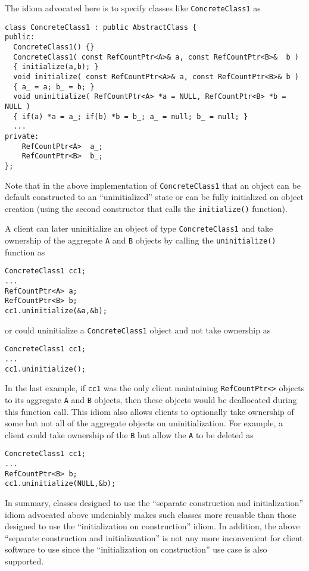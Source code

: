 The idiom advocated here is to specify classes like
{}\texttt{ConcreteClass1} as
%
{\scriptsize\begin{verbatim}
class ConcreteClass1 : public AbstractClass {
public:
  ConcreteClass1() {}
  ConcreteClass1( const RefCountPtr<A>& a, const RefCountPtr<B>&  b )
  { initialize(a,b); }
  void initialize( const RefCountPtr<A>& a, const RefCountPtr<B>& b )
  { a_ = a; b_ = b; }
  void uninitialize( RefCountPtr<A> *a = NULL, RefCountPtr<B> *b = NULL )
  { if(a) *a = a_; if(b) *b = b_; a_ = null; b_ = null; }
  ...
private:
    RefCountPtr<A>  a_;
    RefCountPtr<B>  b_;
};
\end{verbatim}}

Note that in the above implementation of {}\texttt{ConcreteClass1}
that an object can be default constructed to an ``uninitialized''
state or can be fully initialized on object creation (using the second
constructor that calls the {}\texttt{initialize()} function).

A client can later uninitialize an object of type
{}\texttt{Concrete\-Class1} and take ownership of the aggregate
{}\texttt{A} and {}\texttt{B} objects by calling the
{}\texttt{uninitialize()} function as

{\scriptsize\begin{verbatim}
ConcreteClass1 cc1;
...
RefCountPtr<A> a;
RefCountPtr<B> b;
cc1.uninitialize(&a,&b);
\end{verbatim}}

{}\noindent{}or could uninitialize a {}\texttt{Concrete\-Class1}
object and not take ownership as

{\scriptsize\begin{verbatim}
ConcreteClass1 cc1;
...
cc1.uninitialize();
\end{verbatim}}

{}\noindent{}In the last example, if {}\texttt{cc1} was the only
client maintaining {}\texttt{RefCountPtr<>} objects to its aggregate
{}\texttt{A} and {}\texttt{B} objects, then these objects would be
deallocated during this function call.  This idiom also allows clients
to optionally take ownership of some but not all of the aggregate
objects on uninitialization.  For example, a client could take
ownership of the {}\texttt{B} but allow the {}\texttt{A} to be deleted
as

{\scriptsize\begin{verbatim}
ConcreteClass1 cc1;
...
RefCountPtr<B> b;
cc1.uninitialize(NULL,&b);
\end{verbatim}}

In summary, classes designed to use the ``separate construction and
initialization'' idiom advocated above undeniably makes such classes
more reusable than those designed to use the ``initialization on
construction'' idiom.  In addition, the above ``separate construction
and initializaation'' is not any more inconvenient for client software
to use since the ``initialization on construction'' use case is also
supported.
